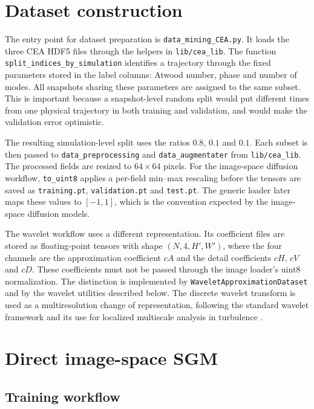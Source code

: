 \section{Dataset construction}

The entry point for dataset preparation is
\lstinline|data_mining_CEA.py|. It loads the three CEA HDF5 files through the
helpers in \lstinline|lib/cea_lib|. The function
\lstinline|split_indices_by_simulation| identifies a trajectory through the
fixed parameters stored in the label columns: Atwood number, phase and number
of modes. All snapshots sharing these parameters are assigned to the same
subset. This is important because a snapshot-level random split would put
different times from one physical trajectory in both training and validation,
and would make the validation error optimistic.

The resulting simulation-level split uses the ratios $0.8$, $0.1$ and $0.1$.
Each subset is then passed to \lstinline|data_preprocessing| and
\lstinline|data_augmentater| from \lstinline|lib/cea_lib|. The processed fields
are resized to $64\times64$ pixels. For the image-space diffusion workflow,
\lstinline|to_uint8| applies a per-field min--max rescaling before the tensors
are saved as \lstinline|training.pt|, \lstinline|validation.pt| and
\lstinline|test.pt|. The generic loader later maps these values to
$[-1,1]$, which is the convention expected by the image-space diffusion
models.

The wavelet workflow uses a different representation. Its coefficient files
are stored as floating-point tensors with shape $(N,4,H',W')$, where the four
channels are the approximation coefficient $cA$ and the detail coefficients
$cH$, $cV$ and $cD$. These coefficients must not be passed through the image
loader's uint8 normalization. The distinction is implemented by
\lstinline|WaveletApproximationDataset| and by the wavelet utilities described
below. The discrete wavelet transform is used as a multiresolution change of
representation, following the standard wavelet framework \citep{Mallat2009}
and its use for localized multiscale analysis in turbulence \citep{Farge1992}.

\section{Direct image-space SGM}

\subsection{Training workflow}

